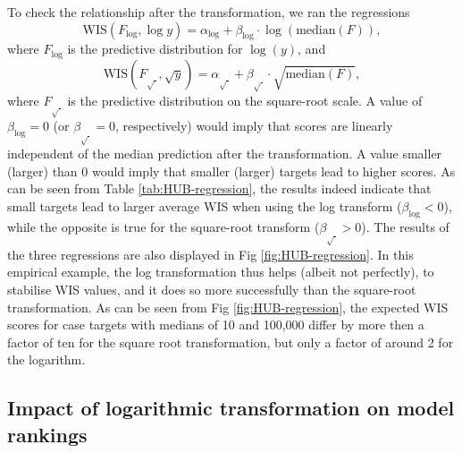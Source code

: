 \documentclass[10pt,letterpaper]{article}
\begin{document}
To check the relationship after the transformation, we ran the regressions
\begin{equation}
    \text{WIS}(F_{\log}, \log y) = \alpha_{\log} + \beta_{\log} \cdot \log{(\text{median}(F))},
\end{equation}
where $F_{\log}$ is the predictive distribution for $\log(y)$, and
\begin{equation}
    \text{WIS}(F_{\sqrt{\ }}, \sqrt{y}) = \alpha_{\sqrt{\ }} + \beta_{\sqrt{\ }} \cdot \sqrt{\text{median}(F)},
\end{equation} 
where $F_{\sqrt{\ }}$ is the predictive distribution on the square-root scale. A value of $\beta_{\log} = 0$ (or $\beta_{\sqrt{\ }} = 0$, respectively) would imply that scores are linearly independent of the median prediction after the transformation. A value smaller (larger) than 0 would imply that smaller (larger) targets lead to higher scores. As can be seen from Table \ref{tab:HUB-regression}, the results indeed indicate that small targets lead to larger average WIS when using the log transform ($\beta_{\log} < 0$), while the opposite is true for the square-root transform ($\beta_{\sqrt{\ }} > 0$). The results of the three regressions are also displayed in Fig \ref{fig:HUB-regression}. In this empirical example, the log transformation thus helps (albeit not perfectly), to stabilise WIS values, and it does so more successfully than the square-root transformation. As can be seen from Fig \ref{fig:HUB-regression}, the expected WIS scores for case targets with medians of 10 and 100,000 differ by more then a factor of ten for the square root transformation, but only a factor of around 2 for the logarithm.

\subsection*{Impact of logarithmic transformation on model rankings}
\label{sec:Hub:cor}
\end{document}
